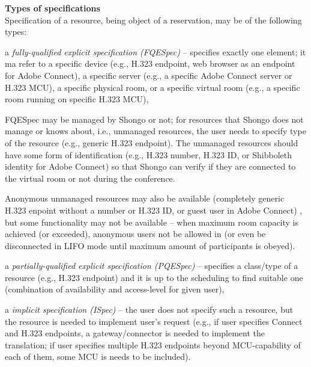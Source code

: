 \documentclass[a4paper]{report}
\makeatletter
\newcounter{UCcounter}
\newenvironment{UseCases}%
	{\begin{list}{\textbf{UC-\arabic{UCcounter}}}{\@nmbrlisttrue\def\@listctr{UCcounter}}}%
	{\end{list}}
\newcommand{\UClabel}[1]{\label{UC:#1}}
\newcommand{\UseCase}[2]{\item\UClabel{#2} \textbf{#1}\\}
\makeatother
\begin{document}
\begin{UseCases}

\UseCase{Types of specifications}{rsv:specifications}

Specification of a resource, being object of a reservation, may be of the
following types:

\begin{compactitem}

\item a \emph{fully-qualified explicit specification (FQESpec)} -- specifies
exactly one element; it ma refer to a specific device (e.g., H.323 endpoint,
web browser as an endpoint for Adobe Connect), a specific server (e.g., a
specific Adobe Connect server or H.323 MCU), a specific physical room, or a
specific virtual room (e.g., a specific room running on specific H.323 MCU),

FQESpec may be managed by Shongo or not; for resources that Shongo does not
manage or knows about, i.e., unmanaged resources, the user needs to specify
type of the resource (e.g., generic H.323 endpoint). The unmanaged resources
should have some form of identification (e.g., H.323 number, H.323 ID, or
Shibboleth identity for Adobe Connect) so that Shongo can verify if they are
connected to the virtual room or not during the conference. 

Anonymous unmanaged resources may also be available (completely generic H.323
enpoint without a number or H.323 ID, or guest user in Adobe Connect) , but
some functionality may not be available -- when maximum room capacity is
achieved (or exceeded), anonymous users not be allowed in (or even be
disconnected in LIFO mode until maximum amount of participants is obeyed).


\item a \emph{partially-qualified explicit specification (PQESpec)} --
specifies a class/type of a resource (e.g., H.323 endpoint) and it is up to the
scheduling to find suitable one (combination of availability and access-level
for given user),

\item a \emph{implicit specification (ISpec)} -- the user does not specify such
a resource, but the resource is needed to implement user's request (e.g., if
user specifies Connect and H.323 endpoints, a gateway/connector is needed to
implement the translation; if user specifies multiple H.323 endpoints beyond
MCU-capability of each of them, some MCU is needs to be included).  

\end{compactitem}


\end{UseCases}
\end{document}

